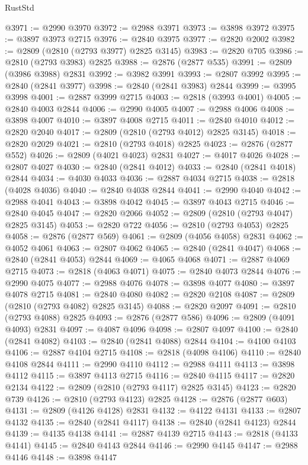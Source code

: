 \begin{lexlean}{RustStd}
\begin{coremodule}
@3971 := @2990 @3970
@3972 := @2988 @3971
@3973 := @3898 @3972
@3975 := @3897 @3973 @2715
@3976 := @2840 @3975
@3977 := @2820 @2002
@3982 := @2809 (@2810 (@2793 @3977) @2825 @3145)
@3983 := @2820 @705
@3986 := @2810 (@2793 @3983) @2825
@3988 := @2876 (@2877 @535)
@3991 := @2809 (@3986 @3988) @2831
@3992 := @3982 @3991
@3993 := @2807 @3992
@3995 := @2840 (@2841 @3977)
@3998 := @2840 (@2841 @3983) @2844
@3999 := @3995 @3998
@4001 := @2887 @3999 @2715
@4003 := @2818 (@3993 @4001)
@4005 := @2840 @4003 @2844
@4006 := @2990 @4005
@4007 := @2988 @4006
@4008 := @3898 @4007
@4010 := @3897 @4008 @2715
@4011 := @2840 @4010
@4012 := @2820 @2040
@4017 := @2809 (@2810 (@2793 @4012) @2825 @3145)
@4018 := @2820 @2029
@4021 := @2810 (@2793 @4018) @2825
@4023 := @2876 (@2877 @552)
@4026 := @2809 (@4021 @4023) @2831
@4027 := @4017 @4026
@4028 := @2807 @4027
@4030 := @2840 (@2841 @4012)
@4033 := @2840 (@2841 @4018) @2844
@4034 := @4030 @4033
@4036 := @2887 @4034 @2715
@4038 := @2818 (@4028 @4036)
@4040 := @2840 @4038 @2844
@4041 := @2990 @4040
@4042 := @2988 @4041
@4043 := @3898 @4042
@4045 := @3897 @4043 @2715
@4046 := @2840 @4045
@4047 := @2820 @2066
@4052 := @2809 (@2810 (@2793 @4047) @2825 @3145)
@4053 := @2820 @722
@4056 := @2810 (@2793 @4053) @2825
@4058 := @2876 (@2877 @569)
@4061 := @2809 (@4056 @4058) @2831
@4062 := @4052 @4061
@4063 := @2807 @4062
@4065 := @2840 (@2841 @4047)
@4068 := @2840 (@2841 @4053) @2844
@4069 := @4065 @4068
@4071 := @2887 @4069 @2715
@4073 := @2818 (@4063 @4071)
@4075 := @2840 @4073 @2844
@4076 := @2990 @4075
@4077 := @2988 @4076
@4078 := @3898 @4077
@4080 := @3897 @4078 @2715
@4081 := @2840 @4080
@4082 := @2820 @2108
@4087 := @2809 (@2810 (@2793 @4082) @2825 @3145)
@4088 := @2820 @2097
@4091 := @2810 (@2793 @4088) @2825
@4093 := @2876 (@2877 @586)
@4096 := @2809 (@4091 @4093) @2831
@4097 := @4087 @4096
@4098 := @2807 @4097
@4100 := @2840 (@2841 @4082)
@4103 := @2840 (@2841 @4088) @2844
@4104 := @4100 @4103
@4106 := @2887 @4104 @2715
@4108 := @2818 (@4098 @4106)
@4110 := @2840 @4108 @2844
@4111 := @2990 @4110
@4112 := @2988 @4111
@4113 := @3898 @4112
@4115 := @3897 @4113 @2715
@4116 := @2840 @4115
@4117 := @2820 @2134
@4122 := @2809 (@2810 (@2793 @4117) @2825 @3145)
@4123 := @2820 @739
@4126 := @2810 (@2793 @4123) @2825
@4128 := @2876 (@2877 @603)
@4131 := @2809 (@4126 @4128) @2831
@4132 := @4122 @4131
@4133 := @2807 @4132
@4135 := @2840 (@2841 @4117)
@4138 := @2840 (@2841 @4123) @2844
@4139 := @4135 @4138
@4141 := @2887 @4139 @2715
@4143 := @2818 (@4133 @4141)
@4145 := @2840 @4143 @2844
@4146 := @2990 @4145
@4147 := @2988 @4146
@4148 := @3898 @4147

\end{coremodule}
\end{lexlean}

